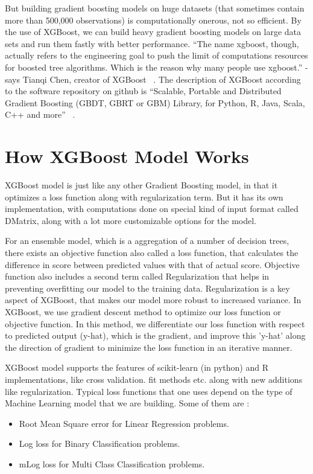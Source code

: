 But building gradient boosting models on huge datasets (that sometimes contain 
more than 500,000 observations) is computationally onerous, not so efficient.
By the use of XGBoost, we can build  heavy gradient boosting models on large
data sets and run them fastly with better performance. ``The name xgboost,
though, actually refers to the engineering goal to push the limit of
computations resources for boosted tree algorithms. Which is the reason why
many people use xgboost.'' - says Tianqi Chen, creator of XGBoost ~\cite {hid-
sp18-401-XGBoost-MLmastery}. The description of XGBoost according to the
software repository on github is ``Scalable, Portable and Distributed Gradient
Boosting (GBDT, GBRT or GBM) Library, for Python, R, Java, Scala, C++ and
more'' ~\cite{hid-sp18-401-XGBoost-Github}.


\section{How XGBoost Model Works}

XGBoost model is just like any other Gradient Boosting model, in that it
optimizes a loss function  along with regularization term. But it has its own
implementation, with computations done on special kind of input format called
DMatrix, along with a lot more customizable options for the model.
 
For an ensemble model, which is a aggregation of a number of decision trees,
there exists an objective function also called a loss function, that
calculates the difference in score between predicted values with that of
actual score. Objective function also includes a second term called
Regularization that helps in preventing overfitting our model to the training
data. Regularization is a key aspect of XGBoost, that makes our model more
robust to increased variance. In XGBoost, we use gradient descent method to
optimize our loss function or objective function. In this method, we
differentiate our loss function with respect to predicted output (y-hat),
which is the gradient, and improve this 'y-hat' along the direction of
gradient to minimize the loss function in an iterative manner.

XGBoost model supports the features of scikit-learn (in python) and R
implementations, like cross validation. fit methods etc. along with new
additions like regularization.  Typical loss functions that one uses depend on
the type of Machine Learning model that we are building. Some of them are :

\begin{itemize}
\item Root Mean Square error for Linear Regression problems. 
\item Log loss for Binary Classification problems. 
\item mLog loss for Multi Class Classification problems.
\end{itemize}

